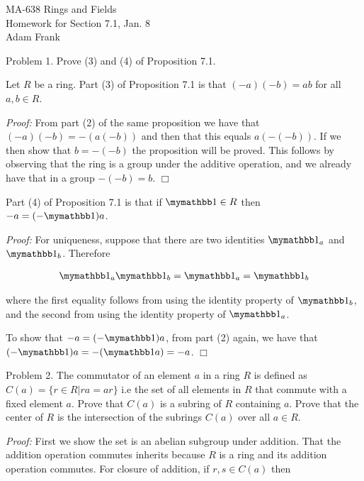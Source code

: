 \documentclass{article}
\begin{document}
  \begin{center} \Large
    MA-638 Rings and Fields\\
    Homework for Section 7.1, Jan. 8 \\
    Adam Frank
  \end{center}

  \vspace{1cm}

  {\Large \color{Sepia} Problem 1.  Prove (3) and (4) of Proposition 7.1.}

  Let $R$ be a ring.  Part (3) of Proposition 7.1 is that $(-a)(-b) = ab$ for all $a,b \in R$.

  {\it Proof:} From part (2) of the same proposition we have that $(-a)(-b) = -(a(-b))$ and then that this equals $a(-(-b))$.  If we then show that $b=-(-b)$ the proposition will be proved.  This follows by observing that the ring is a group under the additive operation, and we already have that in a group $-(-b) = b$.  $\Box$

  Part (4) of Proposition 7.1 is that if $\mymathbb 1 \in R$ then $-a = (-\mymathbb 1)a$.

  {\it Proof:} For uniqueness, suppose that there are two identities $\mymathbb 1_a$ and $\mymathbb 1_b$.  Therefore

  \begin{align*}
    \mymathbb 1_a \mymathbb 1_b = \mymathbb 1_a = \mymathbb 1_b
  \end{align*}

  where the first equality follows from using the identity property of $\mymathbb 1_b$, and the second from using the identity property of $\mymathbb 1_a$.

  To show that $-a = (-\mymathbb 1)a$, from part (2) again, we have that $(-\mymathbb 1)a = -(\mymathbb 1a) = -a$. $\Box$

  \pagebreak

  {\Large \color{Sepia} Problem 2. The commutator of an element $a$ in a ring $R$ is defined as $ C(a) =\{r\in R|ra=ar \}$ i.e the set of all elements in $R$ that commute with a fixed element $a$.  Prove that $C(a)$ is a subring of $R$ containing $a$. Prove that the center of $R$ is the intersection of the subrings $C(a)$ over all $a \in R$.}

  {\it Proof:} First we show the set is an abelian subgroup under addition.  That the addition operation commutes inherits because $R$ is a ring and its addition operation commutes. For closure of addition, if $r,s\in C(a)$ then
\end{document}
